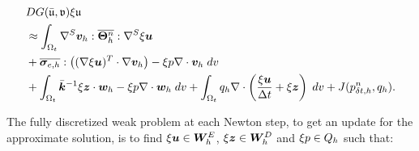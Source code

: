 \begin{equation}
\begin{gathered}\begin{aligned}
&DG(\bar{\mathfrak{u}} , {\mathfrak{v}} ) {\xi \mathfrak{u}} \\
&\approx \int_{\Omega_{t}}  \nabla^{S} \boldsymbol{v}_{h}  : \overline{\boldsymbol{\Theta}^{n}_{h}} :
         \nabla^{S} \xi\boldsymbol{u} \\
&+ \overline{\boldsymbol{\sigma}_{e,h}} :
            \left( (\nabla \xi\boldsymbol{u})^{T} \cdot \nabla \boldsymbol{v}_{h} \right)
- \xi p  \nabla \cdot\boldsymbol{v}_{h} \; dv \\
&+ \int_{\Omega_{t}}  \bar{\boldsymbol{k}}^{-1} \xi\boldsymbol{z} \cdot \boldsymbol{w}_{h}
- \xi p  \nabla\cdot \boldsymbol{w}_{h} \;dv
+  \int_{\Omega_{t}} {q}_{h}\nabla \cdot \left( \frac{\xi\boldsymbol{u}}{\Delta t }
+  \xi\boldsymbol{z} \right) \; dv + J({{p}_{\delta t,h}^{n}},{q}_{h}).
\end{aligned}\end{gathered}
\end{equation}


The fully discretized weak problem at each Newton step, to get an update for the approximate solution, is to find $ \xi\boldsymbol{u} \in \boldsymbol{W}^{E}_{h}$, $\xi\boldsymbol{z} \in \boldsymbol{W}^{D}_{h}$ and $\xi p \in {Q}_{h} $ such that:


